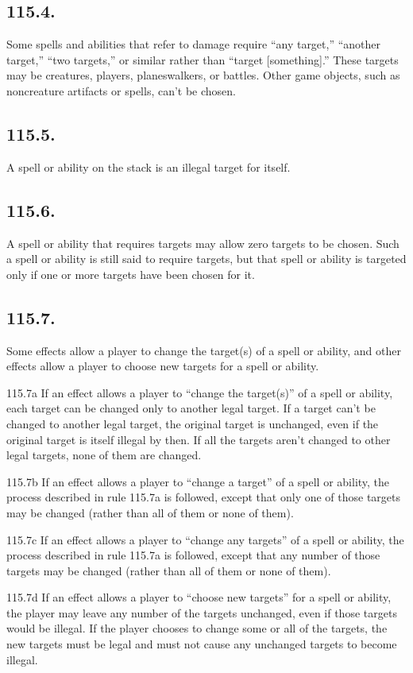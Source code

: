 \subsection*{115.4.}
Some spells and abilities that refer to damage require “any target,” “another target,” “two targets,” or similar rather than “target [something].” These targets may be creatures, players, planeswalkers, or battles. Other game objects, such as noncreature artifacts or spells, can’t be chosen.

\subsection*{115.5.}
A spell or ability on the stack is an illegal target for itself.

\subsection*{115.6.}
A spell or ability that requires targets may allow zero targets to be chosen. Such a spell or ability is still said to require targets, but that spell or ability is targeted only if one or more targets have been chosen for it.

\subsection*{115.7.}
Some effects allow a player to change the target(s) of a spell or ability, and other effects allow a player to choose new targets for a spell or ability.

115.7a If an effect allows a player to “change the target(s)” of a spell or ability, each target can be changed only to another legal target. If a target can’t be changed to another legal target, the original target is unchanged, even if the original target is itself illegal by then. If all the targets aren’t changed to other legal targets, none of them are changed.

115.7b If an effect allows a player to “change a target” of a spell or ability, the process described in rule 115.7a is followed, except that only one of those targets may be changed (rather than all of them or none of them).

115.7c If an effect allows a player to “change any targets” of a spell or ability, the process described in rule 115.7a is followed, except that any number of those targets may be changed (rather than all of them or none of them).

115.7d If an effect allows a player to “choose new targets” for a spell or ability, the player may leave any number of the targets unchanged, even if those targets would be illegal. If the player chooses to change some or all of the targets, the new targets must be legal and must not cause any unchanged targets to become illegal.

